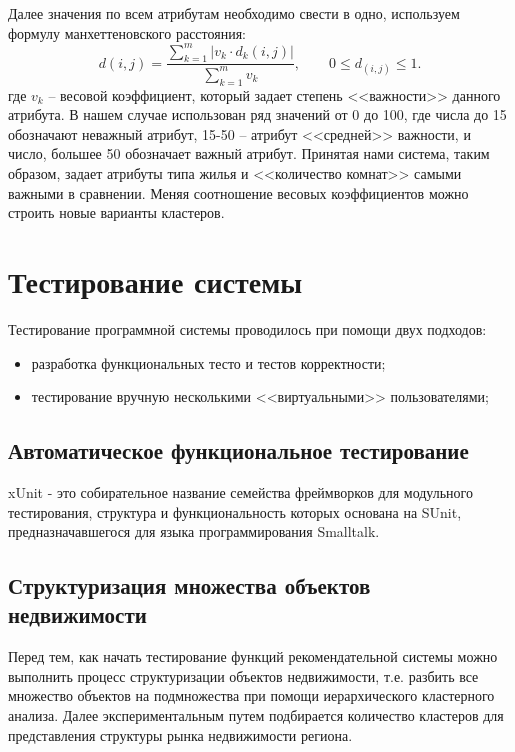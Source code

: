 \documentclass[a4paper,14pt,openany,final]{extreport} %
\begin{document}
Далее значения по всем атрибутам необходимо свести в одно, используем формулу манхеттеновского расстояния:
\[
  d(i,j)=\frac{\sum\limits_{k=1}^m|v_k\cdot d_k(i,j)|}{\sum\limits_{k=1}^m v_k}, \qquad 0\leqslant d_(i,j)\leqslant 1.
\]
где $v_k$ -- весовой коэффициент, который задает степень <<важности>> данного атрибута. В нашем случае использован ряд значений от 0 до 100, где числа до 15 обозначают неважный атрибут, 15-50 -- атрибут <<средней>> важности, и число, большее 50 обозначает важный атрибут. Принятая нами система, таким образом, задает атрибуты типа жилья и <<количество комнат>> самыми важными в сравнении. Меняя соотношение весовых коэффициентов можно строить новые варианты кластеров.

\section{Тестирование системы}
Тестирование программной системы проводилось при помощи двух подходов:
\begin{itemize}
\item разработка функциональных тесто и тестов корректности;
\item тестирование вручную несколькими <<виртуальными>> пользователями;
\end{itemize}

\subsection{Автоматическое функциональное тестирование}
xUnit - это собирательное название семейства фреймворков для модульного тестирования, структура и функциональность которых основана на SUnit, предназначавшегося для языка программирования Smalltalk.

\subsection{Структуризация множества объектов недвижимости}
Перед тем, как начать тестирование функций рекомендательной системы можно выполнить процесс структуризации объектов недвижимости, т.е. разбить все множество объектов на подмножества при помощи иерархического кластерного анализа. Далее экспериментальным путем подбирается количество кластеров для представления структуры рынка недвижимости региона.
\end{document}
